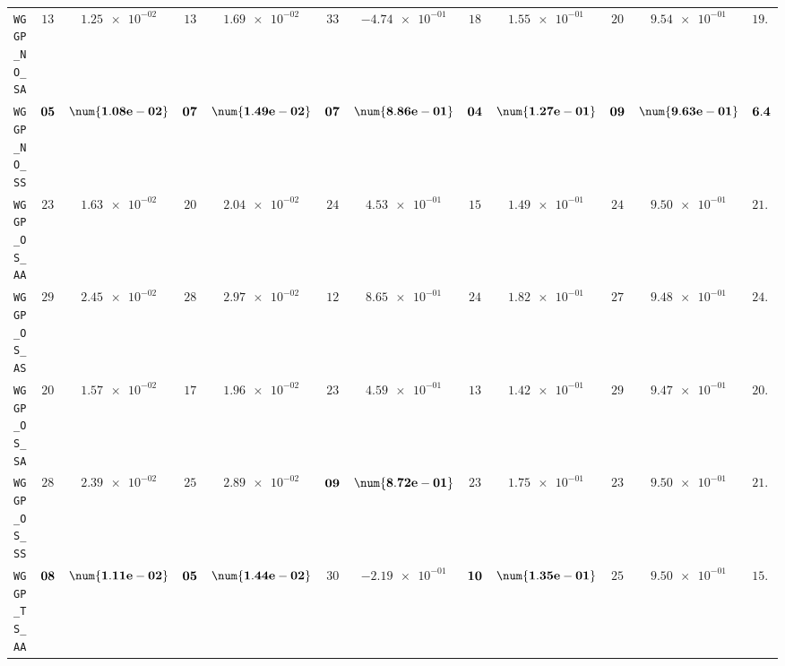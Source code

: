 \begin{xltabular}{\textwidth}{l||cC|cC|cC|cC|cC||c}
	\texttt{WGGP\_NO\_SA} & $ 13$ & $ \num{1.25e-02}$ & $ 13$ & $ \num{1.69e-02}$ & $ 33$ & $ \num{-4.74e-01}$ & $ 18$ & $ \num{1.55e-01}$ & $ 20$ & $ \num{9.54e-01}$ & $ 19.4$  \\
	\texttt{WGGP\_NO\_SS} & $\bf 05$ & $\bf \num{1.08e-02}$ & $\bf 07$ & $\bf \num{1.49e-02}$ & $\bf 07$ & $\bf \num{8.86e-01}$ & $\bf 04$ & $\bf \num{1.27e-01}$ & $\bf 09$ & $\bf \num{9.63e-01}$ & $\bf 6.4$  \\
	\texttt{WGGP\_OS\_AA} & $ 23$ & $ \num{1.63e-02}$ & $ 20$ & $ \num{2.04e-02}$ & $ 24$ & $ \num{4.53e-01}$ & $ 15$ & $ \num{1.49e-01}$ & $ 24$ & $ \num{9.50e-01}$ & $ 21.2$  \\
	\texttt{WGGP\_OS\_AS} & $ 29$ & $ \num{2.45e-02}$ & $ 28$ & $ \num{2.97e-02}$ & $ 12$ & $ \num{8.65e-01}$ & $ 24$ & $ \num{1.82e-01}$ & $ 27$ & $ \num{9.48e-01}$ & $ 24.0$  \\
	\texttt{WGGP\_OS\_SA} & $ 20$ & $ \num{1.57e-02}$ & $ 17$ & $ \num{1.96e-02}$ & $ 23$ & $ \num{4.59e-01}$ & $ 13$ & $ \num{1.42e-01}$ & $ 29$ & $ \num{9.47e-01}$ & $ 20.4$  \\
	\texttt{WGGP\_OS\_SS} & $ 28$ & $ \num{2.39e-02}$ & $ 25$ & $ \num{2.89e-02}$ & $\bf 09$ & $\bf \num{8.72e-01}$ & $ 23$ & $ \num{1.75e-01}$ & $ 23$ & $ \num{9.50e-01}$ & $ 21.6$  \\
	\texttt{WGGP\_TS\_AA} & $\bf 08$ & $\bf \num{1.11e-02}$ & $\bf 05$ & $\bf \num{1.44e-02}$ & $ 30$ & $ \num{-2.19e-01}$ & $\bf 10$ & $\bf \num{1.35e-01}$ & $ 25$ & $ \num{9.50e-01}$ & $ 15.6$  \\

\end{xltabular}
